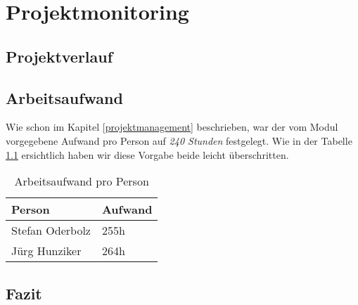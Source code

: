 \chapter{Projektmonitoring}
\label{projektmonitoring}

\section{Projektverlauf}


\section{Arbeitsaufwand}
Wie schon im Kapitel \ref{projektmanagement} beschrieben, war der vom Modul vorgegebene Aufwand pro Person auf \emph{240 Stunden} festgelegt. Wie in der Tabelle \ref{projektmanagement-arbeitsaufwand} ersichtlich haben wir diese Vorgabe beide leicht überschritten.

\begin{table}[H]
\centering
\begin{tabular}{|l|l|}
\hline 
\textbf{Person} & \textbf{Aufwand} \\ 
\hline 
Stefan Oderbolz & 255h \\ 
\hline 
Jürg Hunziker & 264h \\ 
\hline 
\end{tabular}
\caption{Arbeitsaufwand pro Person}
\label{projektmanagement-arbeitsaufwand}
\end{table} 

\section{Fazit}